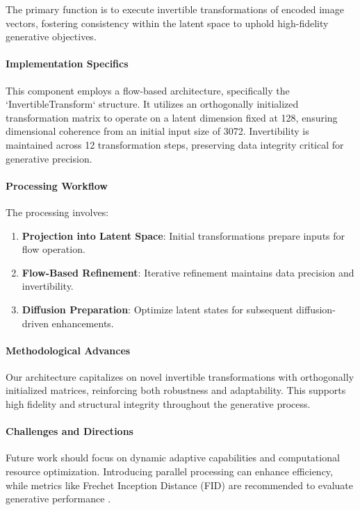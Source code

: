 \documentclass{article} %
\begin{document}
The primary function is to execute invertible transformations of encoded image vectors, fostering consistency within the latent space to uphold high-fidelity generative objectives.

\paragraph{Implementation Specifics}

This component employs a flow-based architecture, specifically the `InvertibleTransform` structure. It utilizes an orthogonally initialized transformation matrix to operate on a latent dimension fixed at 128, ensuring dimensional coherence from an initial input size of 3072. Invertibility is maintained across 12 transformation steps, preserving data integrity critical for generative precision.

\paragraph{Processing Workflow}

The processing involves:
\begin{enumerate}
    \item \textbf{Projection into Latent Space}: Initial transformations prepare inputs for flow operation.
    \item \textbf{Flow-Based Refinement}: Iterative refinement maintains data precision and invertibility.
    \item \textbf{Diffusion Preparation}: Optimize latent states for subsequent diffusion-driven enhancements.
\end{enumerate}

\paragraph{Methodological Advances}

Our architecture capitalizes on novel invertible transformations with orthogonally initialized matrices, reinforcing both robustness and adaptability. This supports high fidelity and structural integrity throughout the generative process.

\paragraph{Challenges and Directions}

Future work should focus on dynamic adaptive capabilities and computational resource optimization. Introducing parallel processing can enhance efficiency, while metrics like Frechet Inception Distance (FID) are recommended to evaluate generative performance \citep{heusel2017gans}.
\end{document}
